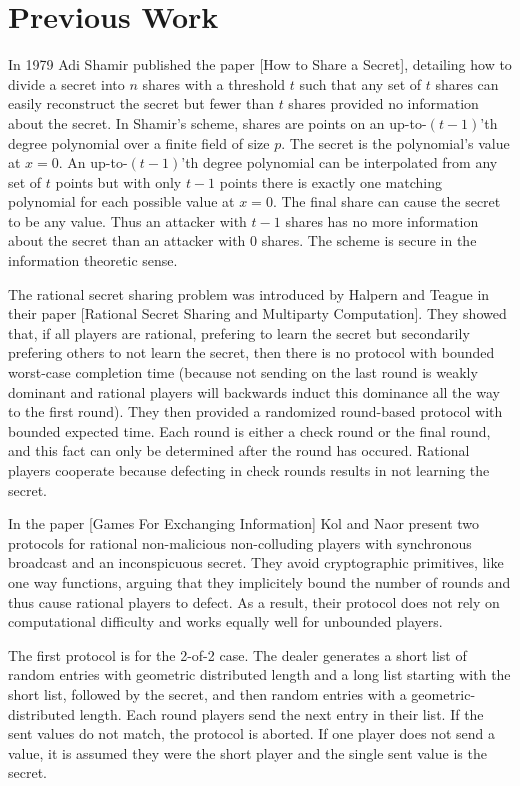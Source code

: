 \documentclass{dalcsthesis}
\begin{document}
\chapter{Previous Work}

In 1979 Adi Shamir published the paper [How to Share a Secret], detailing how to divide a secret into $n$ shares with a threshold $t$ such that any set of $t$ shares can easily reconstruct the secret but fewer than $t$ shares provided no information about the secret. In Shamir's scheme, shares are points on an up-to-$(t-1)$'th degree polynomial over a finite field of size $p$. The secret is the polynomial's value at $x=0$. An up-to-$(t-1)$'th degree polynomial can be interpolated from any set of $t$ points but with only $t-1$ points there is exactly one matching polynomial for each possible value at $x=0$. The final share can cause the secret to be any value. Thus an attacker with $t-1$ shares has no more information about the secret than an attacker with $0$ shares. The scheme is secure in the information theoretic sense.

The rational secret sharing problem was introduced by Halpern and Teague in their paper [Rational Secret Sharing and Multiparty Computation]. They showed that, if all players are rational, prefering to learn the secret but secondarily prefering others to not learn the secret, then there is no protocol with bounded worst-case completion time (because not sending on the last round is weakly dominant and rational players will backwards induct this dominance all the way to the first round). They then provided a randomized round-based protocol with bounded expected time. Each round is either a check round or the final round, and this fact can only be determined after the round has occured. Rational players cooperate because defecting in check rounds results in not learning the secret.

In the paper [Games For Exchanging Information] Kol and Naor present two protocols for rational non-malicious non-colluding players with synchronous broadcast and an inconspicuous secret. They avoid cryptographic primitives, like one way functions, arguing that they implicitely bound the number of rounds and thus cause rational players to defect. As a result, their protocol does not rely on computational difficulty and works equally well for unbounded players.

The first protocol is for the 2-of-2 case. The dealer generates a short list of random entries with geometric distributed length and a long list starting with the short list, followed by the secret, and then random entries with a geometric-distributed length. Each round players send the next entry in their list. If the sent values do not match, the protocol is aborted. If one player does not send a value, it is assumed they were the short player and the single sent value is the secret.
\end{document}
